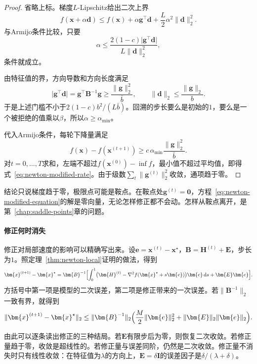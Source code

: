 \begin{proof}
省略上标。梯度$L$-Lipschitz给出二次上界
\[
 f(\bm{x}+\alpha\bm{d})\leq f(\bm{x})+\alpha\bm{g}^\top\bm{d}+\frac L2\alpha^2\lVert\bm{d}\rVert_2^2.
\]
与Armijo条件比较，只要
\[
 \alpha\leq\frac{2(1-c)\lvert\bm{g}^\top\bm{d}\rvert}{L\lVert\bm{d}\rVert_2^2},
\]
条件就成立。

由特征值的界，方向导数和方向长度满足
\[
 \lvert\bm{g}^\top\bm{d}\rvert=\bm{g}^\top\bm{B}^{-1}\bm{g}\geq\frac{\lVert\bm{g}\rVert_2^2}{\bar b},\qquad
 \lVert\bm{d}\rVert_2\leq\frac{\lVert\bm{g}\rVert_2}{b}.
\]
于是上述门槛不小于$2(1-c)b^2/(L\bar b)$。回溯的步长要么是初始的$1$，要么是一个被拒绝的值乘以$\beta$，所以$\alpha\geq\alpha_{\min}$。

代入Armijo条件，每轮下降量满足
\[
 f(\bm{x})-f(\bm{x}^{(t+1)})\geq c\,\alpha_{\min}\frac{\lVert\bm{g}\rVert_2^2}{\bar b}.
\]
对$t=0,\ldots,T$求和，左端不超过$f(\bm{x}^{(0)})-\inf f$，最小值不超过平均值，即得式~\eqref{eq:newton-modified-rate}。由于级数$\sum_t\lVert\bm{g}^{(t)}\rVert_2^2$收敛，通项趋于零。
\end{proof}

结论只说梯度趋于零，极限点可能是鞍点。在鞍点处$\bm{g}^{(t)}=\bm{0}$，方程~\eqref{eq:newton-modified-equation}的解是零向量，无论怎样修正都不会动。怎样从鞍点离开，是第~\ref{chap:saddle-points}章的问题。

\paragraph{修正何时消失}
修正对局部速度的影响可以精确写出来。设$\bm{e}=\bm{x}^{(t)}-\bm{x}^\star$，$\bm{B}=\bm{H}^{(t)}+\bm{E}$，步长为$1$。照定理~\ref{thm:newton-local}证明的做法，得到
\[
 \bm{x}^{(t+1)}-\bm{x}^\star=\bm{B}^{-1}\Bigl[\int_0^1\bigl(\bm{H}^{(t)}-\nabla^2f(\bm{x}^\star+s\bm{e})\bigr)\bm{e}\,\mathrm{d}s+\bm{E}\bm{e}\Bigr].
\]
方括号中第一项是模型的二次误差，第二项是修正带来的一次误差。若$\lVert\bm{B}^{-1}\rVert_2$一致有界，就得到
\begin{equation}
 \lVert\bm{x}^{(t+1)}-\bm{x}^\star\rVert_2\leq\lVert\bm{B}^{-1}\rVert_2\Bigl(\frac M2\lVert\bm{e}\rVert_2^2+\lVert\bm{E}\rVert_2\lVert\bm{e}\rVert_2\Bigr).
 \label{eq:newton-modified-local}
\end{equation}

由此可以逐条读出修正的三种结局。若$\bm{E}$有限步后为零，则恢复二次收敛。若修正量趋于零，收敛是超线性的。若修正量与误差同阶，仍然是二次收敛。修正量不消失时只有线性收敛：在特征值为$\lambda$的方向上，$\bm{E}=\delta\bm{I}$的误差因子是$\delta/(\lambda+\delta)$。

